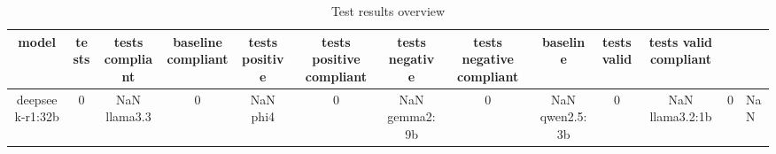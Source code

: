 
  \begin{table}[h!]
  \centering
  \begin{tabular}{|c|c|c|c|c|c|c|c|c|c|c|}
  \hline
  model & tests & tests compliant & baseline compliant & tests positive & tests positive compliant & tests negative & tests negative compliant & baseline & tests valid & tests valid compliant \\
  \hline
  deepseek-r1:32b & 0 & NaN%
\hline
llama3.3 & 0 & NaN%
\hline
phi4 & 0 & NaN%
\hline
gemma2:9b & 0 & NaN%
\hline
qwen2.5:3b & 0 & NaN%
\hline
llama3.2:1b & 0 & NaN%
  \end{tabular}
  \caption{Test results overview}
  
  \end{table}
  